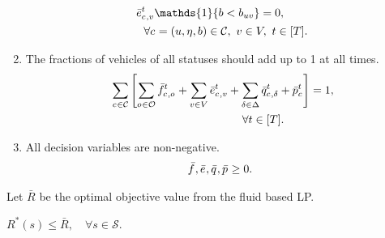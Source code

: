 \begin{enumerate}
    \begin{align}
        &\ \lpreroute{\cartype{}, \destination}{\time} \mathds{1}\{\battery < \batterycost{\origin \destination}\} = 0, \notag\\
        &\quad \forall \cartype{}= (\origin, \timetoarrival, \battery) \in \Cartype,\ \destination \in \Region, \ \time \in [\Horizon]. \label{eq:fluid-rerouting-flow-battery-sufficiency-red}
    \end{align}
    \item The fractions of vehicles of all statuses should add up to 1 at all times.
    \begin{align}
        &\ \sum_{c_{} \in \mathcal{C}} \left[ \sum_{o_{} \in \mathcal{O}} \bar{f}^{t}_{c_{}, o_{}} + \sum_{v \in V} \bar{e}^{t}_{c_{}, v} + \sum_{\delta \in \Delta} \bar{q}^{t}_{c_{}, \delta} + \bar{p}^{t}_{c_{}} \right] = 1,\notag \\
        & \qquad\qquad \qquad\qquad \qquad\qquad  \forall t \in [T]. \label{eq:fluid-total-flow-red}
    \end{align}
    \item All decision variables are non-negative.
    \begin{align}
        \bar{f}^{}_{}, \bar{e}^{}_{}, \bar{q}^{}_{}, \bar{p}^{}_{} \geq 0. \label{eq:fluid-nonneg-red}
    \end{align}
\end{enumerate}

Let $\bar{R}$ be the optimal objective value from the fluid based LP. 

\begin{theorem} \label{thm:fluid-obj-val}
    $R^*(s) \leq \bar{R}, \quad \forall s \in \mathcal{S}$.
\end{theorem}

